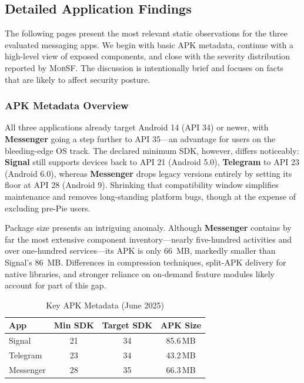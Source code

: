 \documentclass[a4paper,12pt]{report}
\begin{document}
\subsection{Detailed Application Findings}
The following pages present the most relevant static observations for the three
evaluated messaging apps.  We begin with basic APK metadata, continue with a
high-level view of exposed components, and close with the severity distribution
reported by \textsc{MobSF}.  The discussion is intentionally brief and focuses on
facts that are likely to affect security posture.

\subsubsection{APK Metadata Overview}
All three applications already target Android 14 (API 34) or newer, with
\textbf{Messenger} going a step further to API 35—an advantage for users on the
bleeding-edge OS track.
The declared minimum SDK, however, differs noticeably:
\textbf{Signal} still supports devices back to API 21 (Android 5.0),
\textbf{Telegram} to API 23 (Android 6.0), whereas \textbf{Messenger} drops
legacy versions entirely by setting its floor at API 28 (Android 9).
Shrinking that compatibility window simplifies maintenance and removes
long-standing platform bugs, though at the expense of excluding pre-Pie users.

Package size presents an intriguing anomaly.
Although \textbf{Messenger} contains by far the most extensive component
inventory—nearly five-hundred activities and over one-hundred services—its APK
is only \SI{66}{MB}, markedly smaller than Signal’s \SI{86}{MB}.
Differences in compression techniques, split-APK delivery for native libraries,
and stronger reliance on on-demand feature modules likely account for part of
this gap.

\begin{table}[htbp]
  \centering
  \caption{Key APK Metadata (June 2025)}
  \label{tab:metadata}
  \begin{tabular}{|l|c|c|c|}
    \hline
    \textbf{App} & \textbf{Min SDK} & \textbf{Target SDK} & \textbf{APK Size} \\ \hline
    Signal    & 21 & 34 & 85.6\,MB \\ \hline
    Telegram  & 23 & 34 & 43.2\,MB \\ \hline
    Messenger & 28 & 35 & 66.3\,MB \\ \hline
  \end{tabular}
\end{table}
\end{document}
